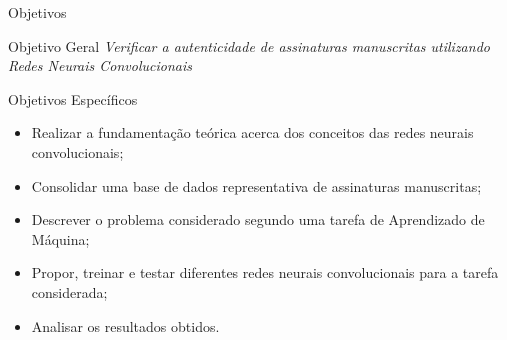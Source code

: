 \begin{frame}{Objetivos}
	\begin{block}{Objetivo Geral}
	\emph{Verificar a autenticidade de assinaturas manuscritas utilizando Redes Neurais Convolucionais}
	\end{block}
	\pause
	\begin{block}{Objetivos Específicos}
		\begin{itemize}
		\footnotesize
		\item Realizar a fundamentação teórica acerca dos conceitos das redes neurais convolucionais;
		\item Consolidar uma base de dados representativa de assinaturas manuscritas;
		\item Descrever o problema considerado segundo uma tarefa de Aprendizado de Máquina;
		\item Propor, treinar e testar diferentes redes neurais convolucionais para a tarefa considerada;
		\item Analisar os resultados obtidos.
		\end{itemize}
	\end{block}
\end{frame}
